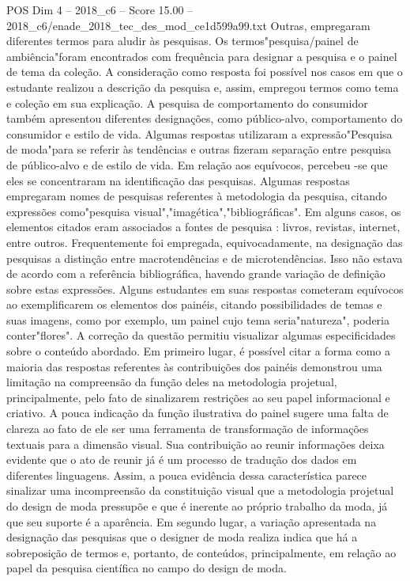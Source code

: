 \begin{textsample}{POS Dim 4 – 2018\_c6 – Score 15.00 – 2018\_c6/enade\_2018\_tec\_des\_mod\_ce1d599a99.txt}
Outras, empregaram diferentes termos para aludir às pesquisas.
Os termos"pesquisa/painel de ambiência"foram encontrados com frequência para designar a pesquisa e o painel de tema da coleção.
A consideração como resposta foi possível nos casos em que o estudante realizou a descrição da pesquisa e, assim, empregou termos como tema e coleção em sua explicação.
A pesquisa de comportamento do consumidor também apresentou diferentes designações, como público-alvo, comportamento do consumidor e estilo de vida.
Algumas respostas utilizaram a expressão"Pesquisa de moda"para se referir às tendências e outras fizeram separação entre pesquisa de público-alvo e de estilo de vida.
Em relação aos equívocos, percebeu -se que eles se concentraram na identificação das pesquisas.
Algumas respostas empregaram nomes de pesquisas referentes à metodologia da pesquisa, citando expressões como"pesquisa visual","imagética","bibliográficas".
Em alguns casos, os elementos citados eram associados a fontes de pesquisa : livros, revistas, internet, entre outros.
Frequentemente foi empregada, equivocadamente, na designação das pesquisas a distinção entre macrotendências e de microtendências.
Isso não estava de acordo com a referência bibliográfica, havendo grande variação de definição sobre estas expressões.
Alguns estudantes em suas respostas cometeram equívocos ao exemplificarem os elementos dos painéis, citando possibilidades de temas e suas imagens, como por exemplo, um painel cujo tema seria"natureza", poderia conter"flores".
A correção da questão permitiu visualizar algumas especificidades sobre o conteúdo abordado.
Em primeiro lugar, é possível citar a forma como a maioria das respostas referentes às contribuições dos painéis demonstrou uma limitação na compreensão da função deles na metodologia projetual, principalmente, pelo fato de sinalizarem restrições ao seu papel informacional e criativo.
A pouca indicação da função ilustrativa do painel sugere uma falta de clareza ao fato de ele ser uma ferramenta de transformação de informações textuais para a dimensão visual.
Sua contribuição ao reunir informações deixa evidente que o ato de reunir já é um processo de tradução dos dados em diferentes linguagens.
Assim, a pouca evidência dessa característica parece sinalizar uma incompreensão da constituição visual que a metodologia projetual do design de moda pressupõe e que é inerente ao próprio trabalho da moda, já que seu suporte é a aparência.
Em segundo lugar, a variação apresentada na designação das pesquisas que o designer de moda realiza indica que há a sobreposição de termos e, portanto, de conteúdos, principalmente, em relação ao papel da pesquisa científica no campo do design de moda.

\end{textsample}
